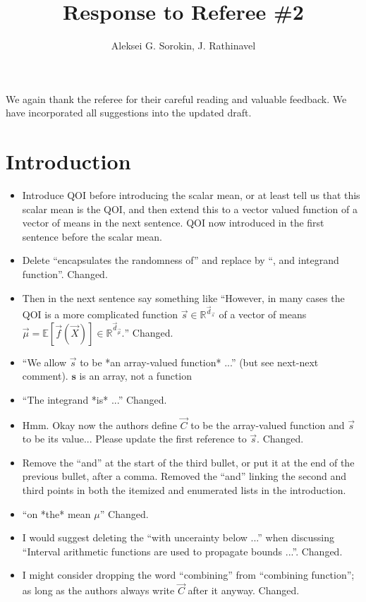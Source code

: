 \documentclass{article}[12pt]
\title{Response to Referee \#2}
\author{Aleksei G. Sorokin, J. Rathinavel}
\date{}
\newcommand{\Referee}[1]{{\color{blue} #1 \newline}}
\begin{document}
\maketitle

We again thank the referee for their careful reading and valuable feedback. We have incorporated all suggestions into the updated draft. 

\section*{Introduction}

\begin{itemize}
    \item \Referee{Introduce QOI before introducing the scalar mean, or at least tell us that this scalar mean is the QOI, and then extend this to a vector valued function of a vector of means in the next sentence.}QOI now introduced in the first sentence before the scalar mean. 
    \item \Referee{Delete ``encapsulates the randomness of'' and replace by ``, and integrand function''.}Changed.
    \item \Referee{Then in the next sentence say something like ``However, in many cases the QOI is a more complicated function $\vec{s} \in \mathbb{R}^{\vec{d}_{\vec{s}}}$ of a vector of means $\vec{\mu} = \mathbb{E}[\vec{f}(\vec{X})] \in \mathbb{R}^{\vec{d}_{\vec{\mu}}}.$''}Changed.
    \item \Referee{``We allow $\vec{s}$ to be *an array-valued function* ...'' (but see next-next
    comment).}$\boldsymbol{s}$ is an array, not a function
    \item \Referee{``The integrand *is* ...''}Changed. 
    \item \Referee{Hmm. Okay now the authors define $\vec{C}$ to be the array-valued function and $\vec{s}$ to be its value... Please update the first reference to $\vec{s}$.}Changed.
    \item \Referee{Remove the ``and'' at the start of the third bullet, or put it at the end of the previous bullet, after a comma.}Removed the ``and'' linking the second and third points in both the itemized and enumerated lists in the introduction. 
    \item \Referee{``on *the* mean $\mu$''}Changed. 
    \item \Referee{I would suggest deleting the ``with uncerainty below ...'' when discussing ``Interval arithmetic functions are used to propagate bounds ...''.}Changed. 
    \item \Referee{I might consider dropping the word ``combining'' from ``combining function''; as long as the authors always write $\vec{C}$ after it anyway.}Changed.

\end{itemize}
\end{document}
